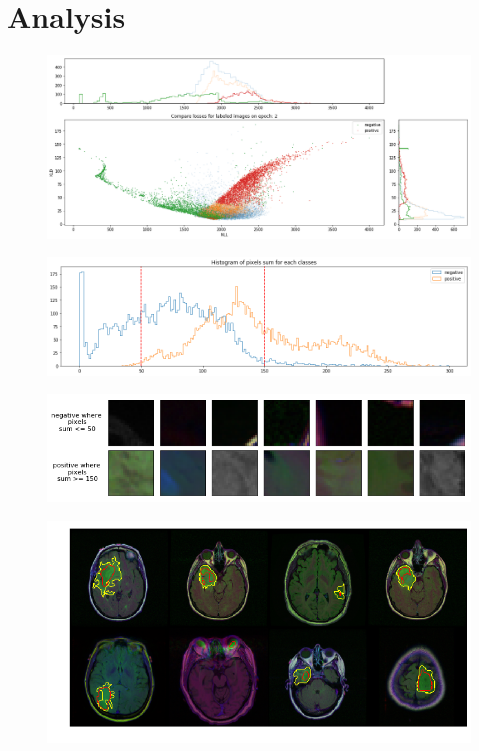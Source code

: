 \section{Analysis}

\begin{figure}[h!]
    \centering
    \includegraphics[width=1.0\textwidth]{images/soft_vae_th}
    \caption{}
    \label{fig:soft_vae_th}
\end{figure}

\begin{figure}[h!]
    \centering
    \includegraphics[width=1.0\textwidth]{images/pixels_hist}
    \caption{}
    \label{fig:pixels_hist}
\end{figure}

\begin{figure}[h!]
    \centering
    \includegraphics[width=1.0\textwidth]{images/pixels_sum_examples}
    \caption{}
    \label{fig:pixels_sum_examples}
\end{figure}

\begin{figure}[h!]
    \centering
    \includegraphics[width=1.0\textwidth]{images/logreg_mask}
    \caption{}
    \label{fig:logreg_mask}
\end{figure}

